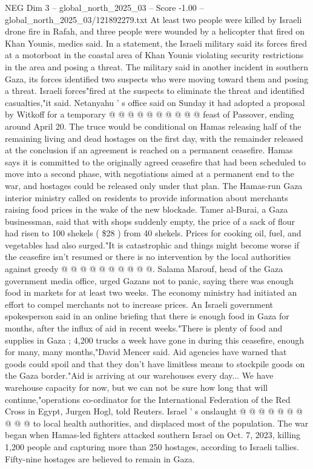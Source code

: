 \begin{textsample}{NEG Dim 3 – global\_north\_2025\_03 – Score -1.00 – global\_north\_2025\_03/121892279.txt}
At least two people were killed by Israeli drone fire in Rafah, and three people were wounded by a helicopter that fired on Khan Younis, medics said.
In a statement, the Israeli military said its forces fired at a motorboat in the coastal area of Khan Younis violating security restrictions in the area and posing a threat.
The military said in another incident in southern Gaza, its forces identified two suspects who were moving toward them and posing a threat.
Israeli forces"fired at the suspects to eliminate the threat and identified casualties,"it said.
Netanyahu ' s office said on Sunday it had adopted a proposal by Witkoff for a temporary @ @ @ @ @ @ @ @ @ @ feast of Passover, ending around April 20.
The truce would be conditional on Hamas releasing half of the remaining living and dead hostages on the first day, with the remainder released at the conclusion if an agreement is reached on a permanent ceasefire.
Hamas says it is committed to the originally agreed ceasefire that had been scheduled to move into a second phase, with negotiations aimed at a permanent end to the war, and hostages could be released only under that plan.
The Hamas-run Gaza interior ministry called on residents to provide information about merchants raising food prices in the wake of the new blockade.
Tamer al-Burai, a Gaza businessman, said that with shops suddenly empty, the price of a sack of flour had risen to 100 shekels ( \$28 ) from 40 shekels.
Prices for cooking oil, fuel, and vegetables had also surged."It is catastrophic and things might become worse if the ceasefire isn't resumed or there is no intervention by the local authorities against greedy @ @ @ @ @ @ @ @ @ @.
Salama Marouf, head of the Gaza government media office, urged Gazans not to panic, saying there was enough food in markets for at least two weeks.
The economy ministry had initiated an effort to compel merchants not to increase prices.
An Israeli government spokesperson said in an online briefing that there is enough food in Gaza for months, after the influx of aid in recent weeks."There is plenty of food and supplies in Gaza ; 4,200 trucks a week have gone in during this ceasefire, enough for many, many months,"David Mencer said.
Aid agencies have warned that goods could spoil and that they don't have limitless means to stockpile goods on the Gaza border."Aid is arriving at our warehouses every day...
We have warehouse capacity for now, but we can not be sure how long that will continue,"operations co-ordinator for the International Federation of the Red Cross in Egypt, Jurgen Hogl, told Reuters.
Israel ' s onslaught @ @ @ @ @ @ @ @ @ @ to local health authorities, and displaced most of the population.
The war began when Hamas-led fighters attacked southern Israel on Oct. 7, 2023, killing 1,200 people and capturing more than 250 hostages, according to Israeli tallies.
Fifty-nine hostages are believed to remain in Gaza.

\end{textsample}
